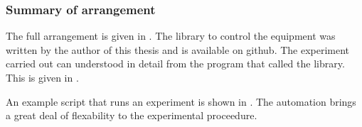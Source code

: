 


\subsubsection{Summary of arrangement}
The full arrangement is given in .
The library to control the equipment was written by the author of this thesis 
and is  available on github\cite{ExperimentCode}.
The  experiment carried out can understood in detail
from the program that called the library.
This is given in .

An example script that runs an experiment is shown in \coderef{}.
The automation brings a great deal of flexability to the experimental proceedure.











